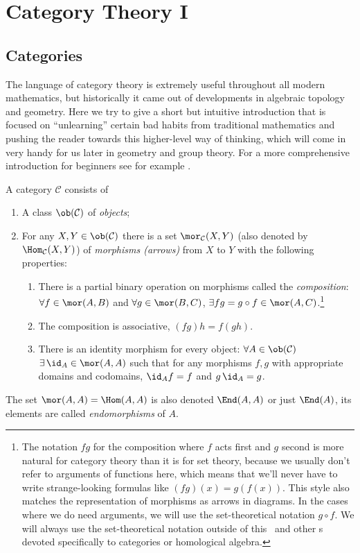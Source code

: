 \chapter{Category Theory I}\label{ch category I}


\section{Categories}

The language of category theory is extremely useful throughout all modern mathematics, but historically it came out of developments in algebraic topology and geometry. Here we try to give a short but intuitive introduction that is focused on ``unlearning'' certain bad habits from traditional mathematics and pushing the reader towards this higher-level way of thinking, which will come in very handy for us later in geometry and group theory. For a more comprehensive introduction for beginners see for example \cite{Leinster, Perrone}.


\begin{defn}[Categories]
    A category $\mathcal{C}$ consists of
    \begin{enumerate}
    \item A class $\ob(\mathcal{C})$ of \emph{objects};
    \item For any $X,Y\in\ob(\mathcal{C})$ there is a set $\mor_{\mathcal{C}}(X,Y)$ (also denoted by $\Hom_{\mathcal{C}}(X,Y)$) of \emph{morphisms (arrows)}  from $X$ to $Y$ with the following properties:
    \begin{enumerate}
    \item There is a partial binary operation on morphisms called the \emph{composition}: $\forall f\in\mor(A,B)$
    and $\forall g\in\mor(B,C)$, $\exists fg=g\circ f\in\mor(A,C)$.\footnote{The notation $fg$ for the composition where $f$ acts first and $g$ second is more natural for category theory than it is for set theory, because we usually don't refer to arguments of functions here, which means that we'll never have to write strange-looking formulas like $(fg)(x)=g(f(x))$. This style also matches the representation of morphisms as arrows in diagrams. In the cases where we do need arguments, we will use the set-theoretical notation $g\circ f$. We will always use the set-theoretical notation outside of this \chap\ and other \sect s devoted specifically to categories or homological algebra.}
    \item The composition is associative, $\left(fg\right)h=f\left(gh\right)$.
    \item There is an identity morphism for every object: $\forall A\in\ob(\mathcal{C})$
    $\exists\,\id_{A}\in\mor(A,A)$ such that for any morphisms $f,g$ with
    appropriate domains and codomains, $\id_{A}f=f$ and $g\,\id_{A}=g$.
    \end{enumerate}
    \end{enumerate}
    The set $\mor(A,A)=\Hom(A,A)$ is also denoted $\End(A,A)$ or just $\End(A)$, its elements are called \emph{endomorphisms} of $A$.
\end{defn}

